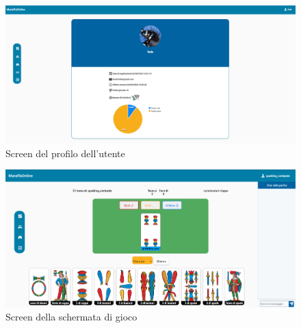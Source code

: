 \begin{figure}[h!]
    \centering 
    \includegraphics[scale=0.45]{report/img/userpage.png}
    \caption{Screen del profilo dell'utente}
    \label{screen}
\end{figure}
\begin{figure}[h!]
    \centering 
    \includegraphics[scale=0.30]{report/img/game.png}
    \caption{ Screen della schermata di gioco}
    \label{screen}
\end{figure}



